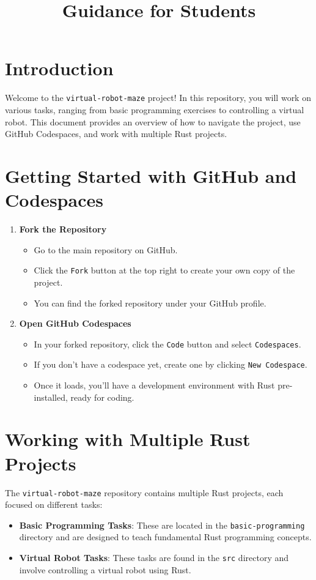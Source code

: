 \documentclass[12pt]{article}
\title{Guidance for Students}
\author{}
\date{}
\begin{document}
	
	\maketitle
	
	\section*{Introduction}
	Welcome to the \texttt{virtual-robot-maze} project! In this repository, you will work on various tasks, ranging from basic programming exercises to controlling a virtual robot. This document provides an overview of how to navigate the project, use GitHub Codespaces, and work with multiple Rust projects.
	
	\section*{Getting Started with GitHub and Codespaces}
	\begin{enumerate}
		\item \textbf{Fork the Repository}
		\begin{itemize}
			\item Go to the main repository on GitHub.
			\item Click the \texttt{Fork} button at the top right to create your own copy of the project.
			\item You can find the forked repository under your GitHub profile.
		\end{itemize}
		
		\item \textbf{Open GitHub Codespaces}
		\begin{itemize}
			\item In your forked repository, click the \texttt{Code} button and select \texttt{Codespaces}.
			\item If you don’t have a codespace yet, create one by clicking \texttt{New Codespace}.
			\item Once it loads, you’ll have a development environment with Rust pre-installed, ready for coding.
		\end{itemize}
	\end{enumerate}
	
	\section*{Working with Multiple Rust Projects}
	The \texttt{virtual-robot-maze} repository contains multiple Rust projects, each focused on different tasks:
	\begin{itemize}
		\item \textbf{Basic Programming Tasks}: These are located in the \texttt{basic-programming} directory and are designed to teach fundamental Rust programming concepts.
		\item \textbf{Virtual Robot Tasks}: These tasks are found in the \texttt{src} directory and involve controlling a virtual robot using Rust.
	\end{itemize}
	
\end{document}
